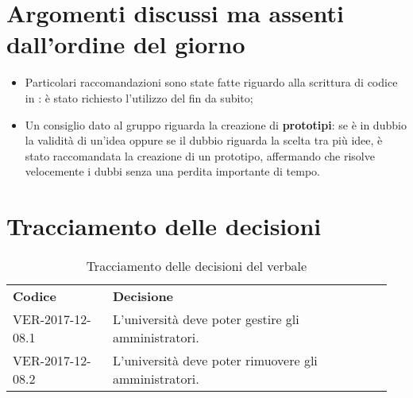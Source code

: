 \documentclass[VER-2017-12-08.tex]{subfiles}
\begin{document}
\section{Argomenti discussi ma assenti dall'ordine del giorno}
\begin{itemize}
	\item Particolari raccomandazioni sono state fatte riguardo alla scrittura di codice in : è stato richiesto l'utilizzo del  fin da subito;
	
	\item Un consiglio dato al gruppo riguarda la creazione di \textbf{prototipi}: se è in dubbio la validità di un'idea oppure se il dubbio riguarda la scelta tra più idee, è stato raccomandata la creazione di un prototipo, affermando che risolve velocemente i dubbi senza una perdita importante di tempo.
\end{itemize}
\section{Tracciamento delle decisioni}
\begin{table}[H]
	\begin{center}
		\begin{tabu} to 
			\tableHeaderStyle
			\textbf{Codice} & \textbf{Decisione} \\
			VER-2017-12-08.1 & L'università deve poter gestire gli amministratori. \\
			VER-2017-12-08.2 & L'università deve poter rimuovere gli amministratori. \\
		\end{tabu}
	\caption{Tracciamento delle decisioni del verbale}
	\end{center}
\end{table}
\end{document}
